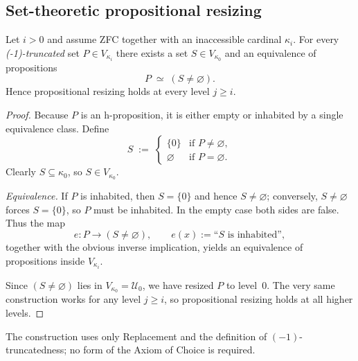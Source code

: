 \documentclass[a4paper,11pt]{article}
\begin{document}
\subsection{Set-theoretic propositional resizing}\label{subsec:set-resize}
\begin{lemma}\label{lem:set-resize}
Let $i>0$ and assume ZFC together with an inaccessible cardinal
$\kappa_{i}$.  
For every \emph{(-1)-truncated} set\/ $P\in V_{\kappa_{i}}$ there exists
a set\/ $S\in V_{\kappa_{0}}$ and an equivalence of propositions
\[
   P\;\simeq\;(S\neq\varnothing).
\]
Hence propositional resizing holds at every level\/ $j\ge i$.
\end{lemma}
\begin{proof}
Because $P$ is an h-proposition, it is either empty or inhabited by a
single equivalence class.  Define
\[
  S \;:=\;
  \begin{cases}
    \{0\}       & \text{if } P\neq\varnothing,\\[4pt]
    \varnothing & \text{if } P=\varnothing.
  \end{cases}
\]
Clearly $S\subseteq\kappa_{0}$, so $S\in V_{\kappa_{0}}$.

\medskip\noindent
\emph{Equivalence.}
If $P$ is inhabited, then $S=\{0\}$ and hence
$S\neq\varnothing$; conversely, $S\neq\varnothing$ forces $S=\{0\}$,
so $P$ must be inhabited.  In the empty case both sides are false.
Thus the map
\[
  e\colon P\longrightarrow(S\neq\varnothing),
  \qquad e(x):=\text{“$S$ is inhabited”},
\]
together with the obvious inverse implication, yields an equivalence
of propositions inside $V_{\kappa_{i}}$.

\medskip
Since $(S\neq\varnothing)$ lies in $V_{\kappa_{0}}=\mathcal U_{0}$, we
have resized $P$ to level~0.  The very same construction works for
any level $j\ge i$, so propositional resizing holds at all higher
levels.
\end{proof}



\begin{remark}
The construction uses only Replacement and the definition of
$(-1)$-truncatedness; no form of the Axiom of Choice is required.
\end{remark}
\end{document}
